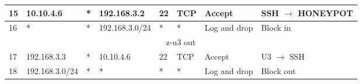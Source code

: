 \documentclass[a4paper, 11pt, oneside]{article}
\begin{document}
\begin{table}[H]
{\begin{tabular}{|llllllll|}
\multicolumn{1}{|l|}{15}          & \multicolumn{1}{l|}{10.10.4.6}                                                    & \multicolumn{1}{l|}{*}                                                              & \multicolumn{1}{l|}{192.168.3.2}                                                       & \multicolumn{1}{l|}{22}                                                                  & \multicolumn{1}{l|}{TCP}               & \multicolumn{1}{l|}{Accept}          & SSH $\rightarrow$ HONEYPOT             \\ \hline
\multicolumn{1}{|l|}{16}          & \multicolumn{1}{l|}{*}                                                            & \multicolumn{1}{l|}{*}                                                              & \multicolumn{1}{l|}{192.168.3.0/24}                                                    & \multicolumn{1}{l|}{*}                                                                   & \multicolumn{1}{l|}{*}                 & \multicolumn{1}{l|}{Log and drop}    & Block in                               \\ \hline
\multicolumn{8}{|c|}{{\color[HTML]{FE0000} z-u3 out}}                                                                                                                                                                                                                                                                                                                                                                                                                                                                    \\ \hline
\multicolumn{1}{|l|}{17}          & \multicolumn{1}{l|}{192.168.3.3}                                                  & \multicolumn{1}{l|}{*}                                                              & \multicolumn{1}{l|}{10.10.4.6}                                                         & \multicolumn{1}{l|}{22}                                                                  & \multicolumn{1}{l|}{TCP}               & \multicolumn{1}{l|}{Accept}          & U3 $\rightarrow$ SSH                   \\ \hline
\multicolumn{1}{|l|}{18}          & \multicolumn{1}{l|}{192.168.3.0/24}                                               & \multicolumn{1}{l|}{*}                                                              & \multicolumn{1}{l|}{*}                                                                 & \multicolumn{1}{l|}{*}                                                                   & \multicolumn{1}{l|}{*}                 & \multicolumn{1}{l|}{Log and drop}    & Block out                              \\ \hline

\end{tabular}}
\end{table}
\end{document}
